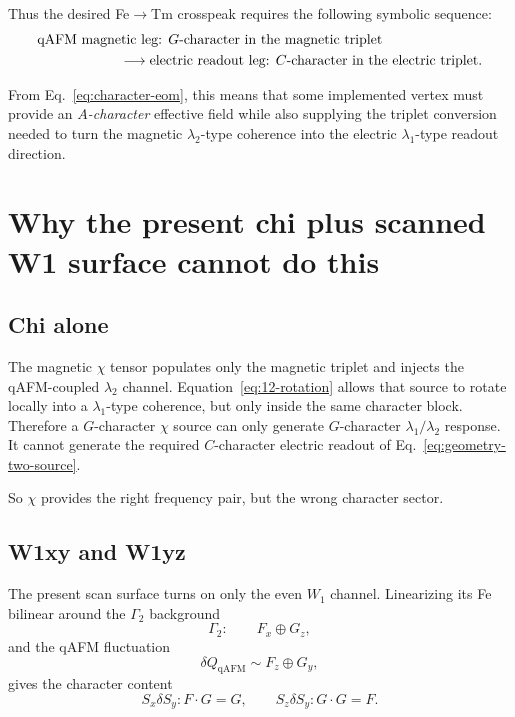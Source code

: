 \documentclass[11pt]{article}
\begin{document}
Thus the desired Fe$\rightarrow$Tm crosspeak requires the following symbolic
sequence:
\begin{equation}
\begin{aligned}
&\text{qAFM magnetic leg: } G\text{-character in the magnetic triplet} \\
&\hspace{5.9em}\longrightarrow
\text{electric readout leg: } C\text{-character in the electric triplet}.
\end{aligned}
\label{eq:needed-conversion}
\end{equation}

From Eq.~\eqref{eq:character-eom}, this means that some implemented vertex must
provide an \emph{$A$-character} effective field while also supplying the
triplet conversion needed to turn the magnetic $\lambda_2$-type coherence into
the electric $\lambda_1$-type readout direction.

\section{Why the present chi plus scanned W1 surface cannot do this}

\subsection{Chi alone}

The magnetic $\chi$ tensor populates only the magnetic triplet and injects the
qAFM-coupled $\lambda_2$ channel. Equation~\eqref{eq:12-rotation} allows that
source to rotate locally into a $\lambda_1$-type coherence, but only inside the
same character block. Therefore a $G$-character $\chi$ source can only generate
$G$-character $\lambda_1/\lambda_2$ response. It cannot generate the required
$C$-character electric readout of Eq.~\eqref{eq:geometry-two-source}.

So $\chi$ provides the right frequency pair, but the wrong character sector.

\subsection{W1xy and W1yz}

The present scan surface turns on only the even $W_1$ channel. Linearizing its
Fe bilinear around the $\Gamma_2$ background
\begin{equation}
\Gamma_2: \qquad F_x \oplus G_z,
\end{equation}
and the qAFM fluctuation
\begin{equation}
\delta Q_{\mathrm{qAFM}} \sim F_z \oplus G_y,
\end{equation}
gives the character content
\begin{equation}
S_x \delta S_y : F \cdot G = G,
\qquad
S_z \delta S_y : G \cdot G = F.
\label{eq:w1-characters}
\end{equation}
\end{document}
